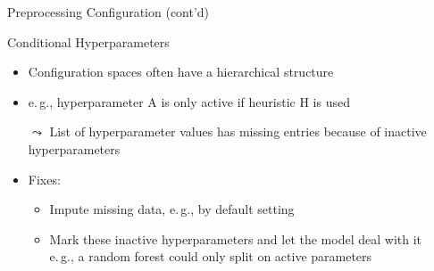 \begin{frame}[c]{Preprocessing Configuration (cont'd)}

\begin{block}{Conditional Hyperparameters}
\begin{itemize}
\item Configuration spaces often have a hierarchical structure
\item e.$\,$g., hyperparameter A is only active if heuristic H is used
\pause
\item[$\leadsto$] List of hyperparameter values has missing entries because of inactive hyperparameters
\medskip
\pause
\item Fixes:
\begin{itemize}
\item Impute missing data, e.$\,$g., by default setting
\item Mark these inactive hyperparameters and let the model deal with it\\
e.$\,$g., a random forest could only split on active parameters
\end{itemize}
\end{itemize}
\end{block}

\end{frame}

